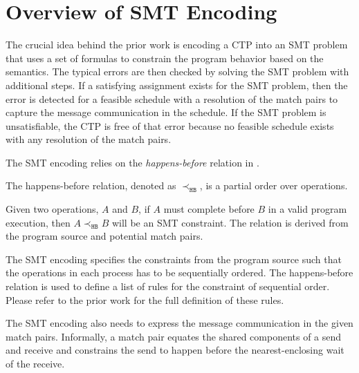\section{Overview of SMT Encoding}



The crucial idea behind the prior work is encoding a CTP into an SMT problem that uses a set of formulas to constrain the program behavior based on the semantics. 
The typical errors are then checked by solving the SMT problem with additional steps. If a satisfying assignment exists for the SMT problem, then the error is detected for a feasible schedule with a resolution of the match pairs to capture the message communication in the schedule. If the SMT problem is unsatisfiable, the CTP is free of that error because no feasible schedule exists with any resolution of the match pairs.


The SMT encoding relies on the \textit{happens-before} relation in .
\begin{definition}
The happens-before relation, denoted as $\prec_{\mathtt{HB}}$, is a partial order over operations.
\label{def:hb}
\end{definition}
Given two operations, $A$ and $B$, if $A$ must complete before $B$ in a valid program execution, then $A \prec_{\mathtt{HB}} B$ will be an SMT constraint. 
The relation is derived from the program source and potential match pairs. 

The SMT encoding specifies the constraints from the program source such that the operations in each process has to be sequentially ordered. The happens-before relation is used to define a list of rules for the constraint of sequential order. Please refer to the prior work \cite{} for the full definition of these rules. 

The SMT encoding also needs to express the message communication in the given match pairs.
Informally, a match pair equates the shared components of a send and receive and constrains the send to happen before the nearest-enclosing wait of the receive. 

